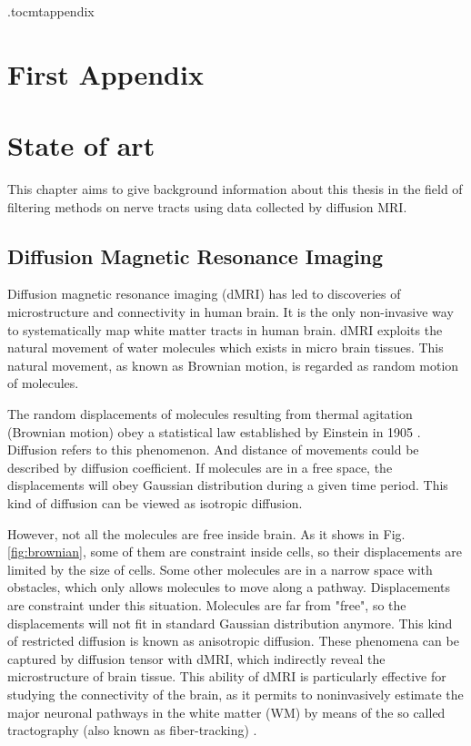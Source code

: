 \newpage
\appendix
\newpage
\etocdepthtag.toc{mtappendix}
\tableofcontents
\newpage


\chapter{First Appendix}


\chapter{State of art}
This chapter aims to give background information about this thesis in the field
of filtering methods on nerve tracts using data collected by diffusion MRI. 


\section{Diffusion Magnetic Resonance Imaging}

Diffusion magnetic resonance imaging (dMRI) has led to discoveries of microstructure and connectivity in human brain.
It is the only non-invasive way to 
systematically map white matter tracts in human brain.
dMRI exploits the natural movement of water molecules 
which exists in micro brain tissues. 
This natural movement, as known as Brownian motion, 
is regarded as random motion of molecules. 

The random displacements of molecules 
resulting from thermal agitation (Brownian motion) 
obey a statistical law established by Einstein in 1905 \cite*{lebihanLookingFunctionalArchitecture2003}.
Diffusion refers to this phenomenon.
And distance of movements could be described by diffusion coefficient.
If molecules are in a free space, the displacements will obey Gaussian distribution
during a given time period. This kind of diffusion can be viewed as isotropic diffusion.

However, not all the molecules are free inside brain. As it shows in Fig. \ref{fig:brownian},
some of them are constraint inside cells, so their displacements are limited by the size of cells. 
Some other molecules are in a narrow space with obstacles, which only allows molecules
to move along a pathway. Displacements are constraint under this situation.
Molecules are far from "free", so the displacements will not fit in standard Gaussian distribution anymore.
This kind of restricted diffusion is known as anisotropic diffusion.
These phenomena can be captured by diffusion tensor with dMRI, which indirectly reveal the microstructure of brain tissue.
This ability of dMRI is particularly effective for studying the connectivity of the brain,
as it permits to noninvasively estimate the major neuronal pathways in the white matter (WM) 
by means of the so called tractography (also known as fiber-tracking) \cite*{daducciCOMMITConvexOptimization2015}.

